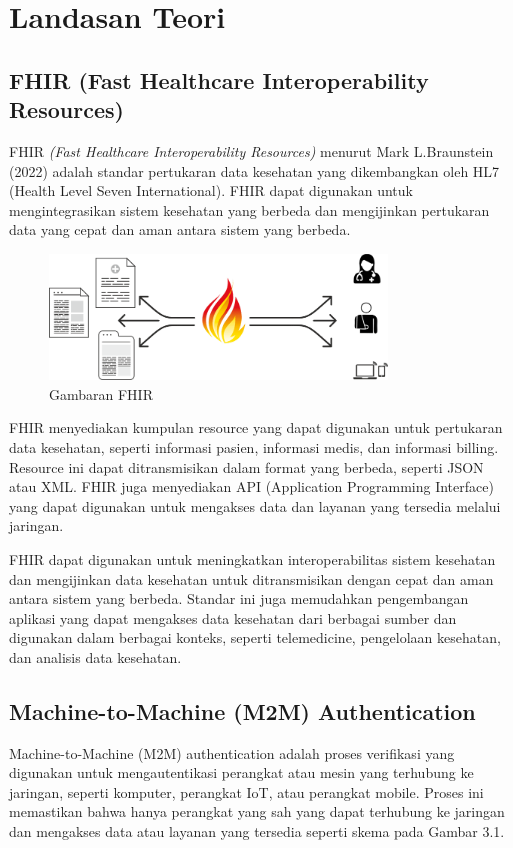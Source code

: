 \chapter{Landasan Teori}

\section{FHIR (Fast Healthcare Interoperability Resources)}
FHIR \textit{(Fast Healthcare Interoperability Resources)} menurut Mark L.Braunstein (2022) adalah standar pertukaran data kesehatan yang dikembangkan oleh HL7 (Health Level Seven International). FHIR dapat digunakan untuk mengintegrasikan sistem kesehatan yang berbeda dan mengijinkan pertukaran data yang cepat dan aman antara sistem yang berbeda.
\begin{figure}
    \centering
    \includegraphics[width=0.8\textwidth]{contents/chapter-3/FHIR-img-1.png}
    \caption{Gambaran FHIR}
    \label{fig:my_label}
\end{figure}
FHIR menyediakan kumpulan resource yang dapat digunakan untuk pertukaran data kesehatan, seperti informasi pasien, informasi medis, dan informasi billing. Resource ini dapat ditransmisikan dalam format yang berbeda, seperti JSON atau XML. FHIR juga menyediakan API (Application Programming Interface) yang dapat digunakan untuk mengakses data dan layanan yang tersedia melalui jaringan.

FHIR dapat digunakan untuk meningkatkan interoperabilitas sistem kesehatan dan mengijinkan data kesehatan untuk ditransmisikan dengan cepat dan aman antara sistem yang berbeda. Standar ini juga memudahkan pengembangan aplikasi yang dapat mengakses data kesehatan dari berbagai sumber dan digunakan dalam berbagai konteks, seperti telemedicine, pengelolaan kesehatan, dan analisis data kesehatan.


\section{Machine-to-Machine (M2M) Authentication}
Machine-to-Machine (M2M) authentication adalah proses verifikasi yang digunakan untuk mengautentikasi perangkat atau mesin yang terhubung ke jaringan, seperti komputer, perangkat IoT, atau perangkat mobile. Proses ini memastikan bahwa hanya perangkat yang sah yang dapat terhubung ke jaringan dan mengakses data atau layanan yang tersedia seperti skema pada Gambar 3.1.

